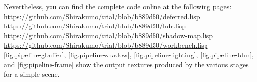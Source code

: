 \documentclass[format=sigconf]{acmart}
\begin{document}
Nevertheless, you can find the complete code online at the following pages: \\
\url{https://github.com/Shirakumo/trial/blob/b889d50/deferred.lisp} \\
\url{https://github.com/Shirakumo/trial/blob/b889d50/hdr.lisp} \\
\url{https://github.com/Shirakumo/trial/blob/b889d50/shadow-map.lisp} \\
\url{https://github.com/Shirakumo/trial/blob/b889d50/workbench.lisp} \\

\autoref{fig:pipeline-gbuffer}, \autoref{fig:pipeline-shadow}, \autoref{fig:pipeline-lighting}, \autoref{fig:pipeline-blur}, and \autoref{fig:pipeline-frame} show the output textures produced by the various stages for a simple scene.
\end{document}
